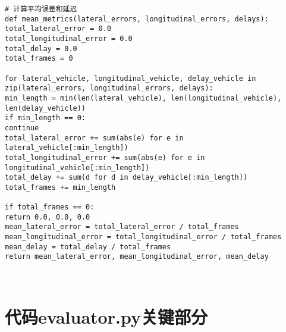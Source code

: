 \begin{lstlisting}
# 计算平均误差和延迟
def mean_metrics(lateral_errors, longitudinal_errors, delays):
total_lateral_error = 0.0
total_longitudinal_error = 0.0
total_delay = 0.0
total_frames = 0

for lateral_vehicle, longitudinal_vehicle, delay_vehicle in zip(lateral_errors, longitudinal_errors, delays):
min_length = min(len(lateral_vehicle), len(longitudinal_vehicle), len(delay_vehicle))
if min_length == 0:
continue
total_lateral_error += sum(abs(e) for e in lateral_vehicle[:min_length])
total_longitudinal_error += sum(abs(e) for e in longitudinal_vehicle[:min_length])
total_delay += sum(d for d in delay_vehicle[:min_length])
total_frames += min_length

if total_frames == 0:
return 0.0, 0.0, 0.0
mean_lateral_error = total_lateral_error / total_frames
mean_longitudinal_error = total_longitudinal_error / total_frames
mean_delay = total_delay / total_frames
return mean_lateral_error, mean_longitudinal_error, mean_delay



\end{lstlisting}


\section{代码evaluator.py关键部分}



